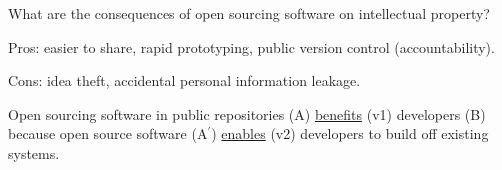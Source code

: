 \documentclass[12pt]{article}
\begin{document}
What are the consequences of open sourcing software on intellectual property?

Pros: easier to share, rapid prototyping, public version control (accountability).

Cons: idea theft, accidental personal information leakage.

Open sourcing software in public repositories (A) \uline{benefits} (v1) developers (B) because open source software (A$^\prime$) \uline{enables} (v2) developers to build off existing systems.

\end{document}

